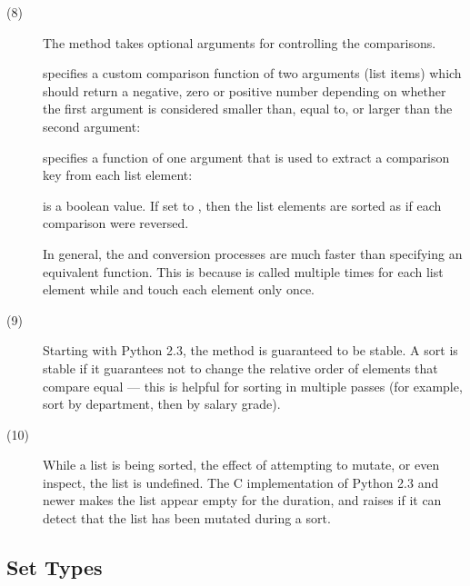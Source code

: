 \begin{description}
\item[(8)] The  method takes optional arguments for
  controlling the comparisons.

   specifies a custom comparison function of two arguments
     (list items) which should return a negative, zero or positive number
     depending on whether the first argument is considered smaller than,
     equal to, or larger than the second argument:
     
   specifies a function of one argument that is used to
     extract a comparison key from each list element:

   is a boolean value.  If set to , then the
     list elements are sorted as if each comparison were reversed.

  In general, the  and  conversion processes are
  much faster than specifying an equivalent  function.  This is
  because  is called multiple times for each list element while
   and  touch each element only once.



\item[(9)] Starting with Python 2.3, the  method is
  guaranteed to be stable.  A sort is stable if it guarantees not to
  change the relative order of elements that compare equal --- this is
  helpful for sorting in multiple passes (for example, sort by
  department, then by salary grade).

\item[(10)] While a list is being sorted, the effect of attempting to
  mutate, or even inspect, the list is undefined.  The C
  implementation of Python 2.3 and newer makes the list appear empty
  for the duration, and raises  if it can detect
  that the list has been mutated during a sort.
\end{description}

\subsection{Set Types \label{types-set}}

